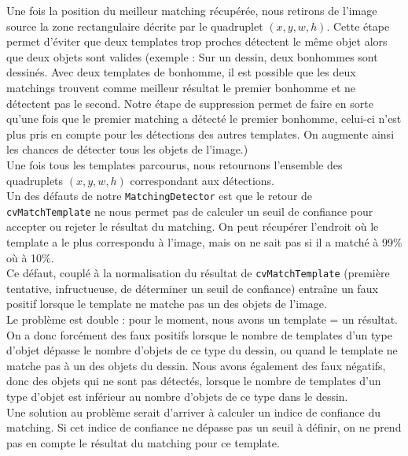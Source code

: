 Une fois la position du meilleur matching récupérée, nous retirons de l'image source la zone rectangulaire décrite par le quadruplet $(x,y,w,h)$. Cette étape permet d'éviter que deux templates trop proches détectent le même objet alors que deux objets sont valides (exemple : Sur un dessin, deux bonhommes sont dessinés. Avec deux templates de bonhomme, il est possible que les deux matchings trouvent comme meilleur résultat le premier bonhomme et ne détectent pas le second. Notre étape de suppression permet de faire en sorte qu'une fois que le premier matching a détecté le premier bonhomme, celui-ci n'est plus pris en compte pour les détections des autres templates. On augmente ainsi les chances de détecter tous les objets de l'image.)\\

Une fois tous les templates parcourus, nous retournons l'ensemble des quadruplets $(x,y,w,h)$ correspondant aux détections.\\

Un des défauts de notre \texttt{MatchingDetector} est que le retour de\\ \texttt{cvMatchTemplate} ne nous permet pas de calculer un seuil de confiance pour accepter ou rejeter le résultat du matching. On peut récupérer l'endroit où le template a le plus correspondu à l'image, mais on ne sait pas si il a matché à 99\% où à 10\%.\\

Ce défaut, couplé à la normalisation du résultat de \texttt{cvMatchTemplate} (première tentative, infructueuse, de déterminer un seuil de confiance) entraîne un faux positif lorsque le template ne matche pas un des objets de l'image.\\ Le problème est double : pour le moment, nous avons un template = un résultat. On a donc forcément des faux positifs lorsque le nombre de templates d'un type d'objet dépasse le nombre d'objets de ce type du dessin, ou quand le template ne matche pas à un des objets du dessin. Nous avons également des faux négatifs, donc des objets qui ne sont pas détectés, lorsque le nombre de templates d'un type d'objet est inférieur au nombre d'objets de ce type dans le dessin.\\

Une solution au problème serait d'arriver à calculer un indice de confiance du matching. Si cet indice de confiance ne dépasse pas un seuil à définir, on ne prend pas en compte le résultat du matching pour ce template.\\

